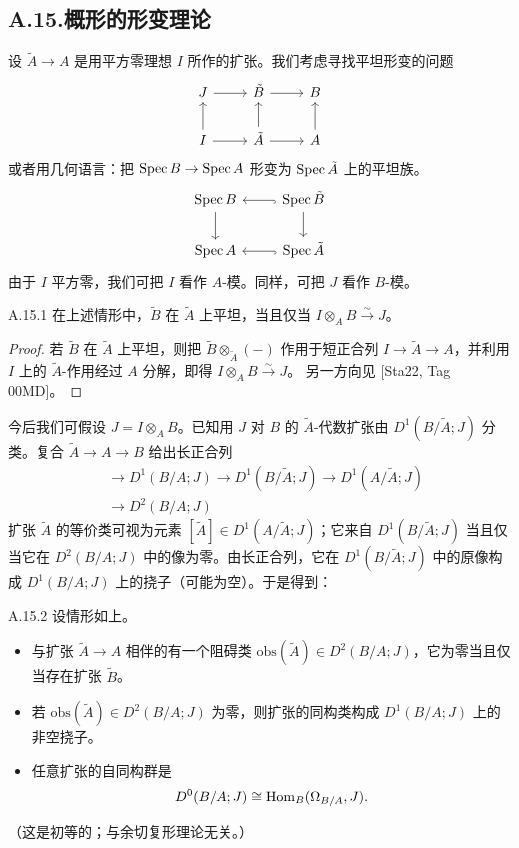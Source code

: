 \subsection*{A.15.\quad 概形的形变理论}

设 $\tilde A\to A$ 是用平方零理想 $I$ 所作的扩张。我们考虑寻找平坦形变的问题
\[
\begin{tikzcd}
J \arrow[r] & \tilde B \arrow[r] & B \\
I \arrow[r] \arrow[u] & \tilde A \arrow[r] \arrow[u] & A \arrow[u]
\end{tikzcd}
\]
或者用几何语言：把 $\operatorname{Spec} B\to\operatorname{Spec} A$ 形变为 $\operatorname{Spec}\tilde A$ 上的平坦族。
\[
\begin{tikzcd}
\Spec B \arrow[d] & \Spec\tilde B \arrow[l, hook] \arrow[d] \\
\Spec A & \Spec\tilde A \arrow[l, hook]
\end{tikzcd}
\]
由于 $I$ 平方零，我们可把 $I$ 看作 $A$-模。同样，可把 $J$ 看作 $B$-模。

\begin{lem}{A.15.1}\label{thm:a6-08-5}
在上述情形中，$\tilde B$ 在 $\tilde A$ 上平坦，当且仅当 $I\otimes_A B\xrightarrow{\sim}J$。
\end{lem}

\begin{proof}
若 $\tilde B$ 在 $\tilde A$ 上平坦，则把 $\tilde B\otimes_{\tilde A}(-)$ 作用于短正合列 $I\to\tilde A\to A$，并利用 $I$ 上的 $\tilde A$-作用经过 $A$ 分解，即得 $I\otimes_A B\xrightarrow{\sim}J$。
另一方向见 [Sta22, Tag 00MD]。
\end{proof}


今后我们可假设 $J=I\otimes_A B$。已知用 $J$ 对 $B$ 的 $\tilde A$-代数扩张由 $D^1(B/\tilde A;J)$ 分类。复合 $\tilde A\to A\to B$ 给出长正合列
\[
\begin{aligned}
&\to D^1(B/A;J)\to D^1(B/\tilde A;J)\to D^1(A/\tilde A;J)\\
&\to D^2(B/A;J)
\end{aligned}
\]
扩张 $\tilde A$ 的等价类可视为元素 $[\tilde A]\in D^1(A/\tilde A;J)$；它来自 $D^1(B/\tilde A;J)$ 当且仅当它在 $D^2(B/A;J)$ 中的像为零。由长正合列，它在 $D^1(B/\tilde A;J)$ 中的原像构成 $D^1(B/A;J)$ 上的挠子（可能为空）。于是得到：

\begin{prop}{A.15.2}\label{thm:a6-08-6}
设情形如上。
\begin{itemize}
\item 与扩张 $\tilde A\to A$ 相伴的有一个阻碍类 $\mathrm{obs}(\tilde A)\in D^2(B/A;J)$，它为零当且仅当存在扩张 $\tilde B$。
\item 若 $\mathrm{obs}(\tilde A)\in D^2(B/A;J)$ 为零，则扩张的同构类构成 $D^1(B/A;J)$ 上的非空挠子。
\item 任意扩张的自同构群是
\[
D^0(B/A;J)\cong\operatorname{Hom}_B(\Omega_{B/A},J).
\]
\end{itemize}
（这是初等的；与余切复形理论无关。）
\end{prop}

